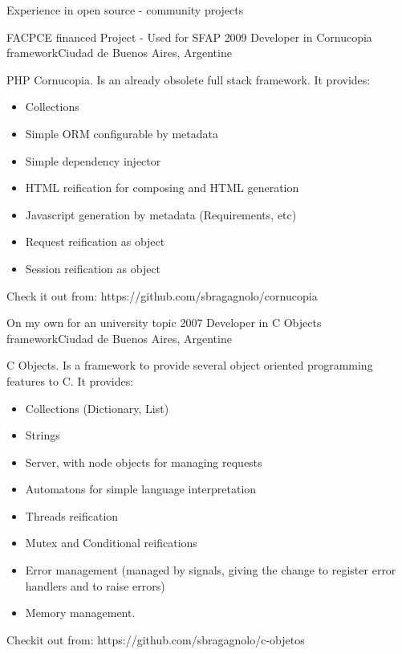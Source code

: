 \documentclass{resume} %
\begin{document}
\begin{rSection}{Experience in open source - community projects}
\begin{rSubsection}{FACPCE financed Project - Used for SFAP }{ 2009 }{Developer in Cornucopia framework}{Ciudad de Buenos Aires, Argentine}	
\item PHP Cornucopia. Is an already obsolete full stack framework. It provides:
	\begin{itemize}
		\item Collections
		\item Simple ORM configurable by metadata 
		\item Simple dependency injector
		\item HTML reification for composing and HTML generation
		\item Javascript generation by metadata (Requirements, etc)
		\item Request reification as object
		\item Session reification as object
	\end{itemize}
\item Check it out from: https://github.com/sbragagnolo/cornucopia
\end{rSubsection}


\begin{rSubsection}{On my own for an university topic}{ 2007 }{Developer in C Objects framework}{Ciudad de Buenos Aires, Argentine}
\item C Objects. Is a framework to provide several object oriented programming features to C. It provides:
	\begin{itemize}
		\item Collections (Dictionary, List) 
		\item Strings
		\item Server, with node objects for managing requests
		\item Automatons for simple language interpretation 
		\item Threads reification 
		\item Mutex and Conditional reifications
		\item Error management (managed by signals, giving the change to register error handlers and to raise errors) 
		\item Memory management.
	\end{itemize}
\item Checkit out from: https://github.com/sbragagnolo/c-objetos

\end{rSubsection}


\end{rSection}
\end{document}
